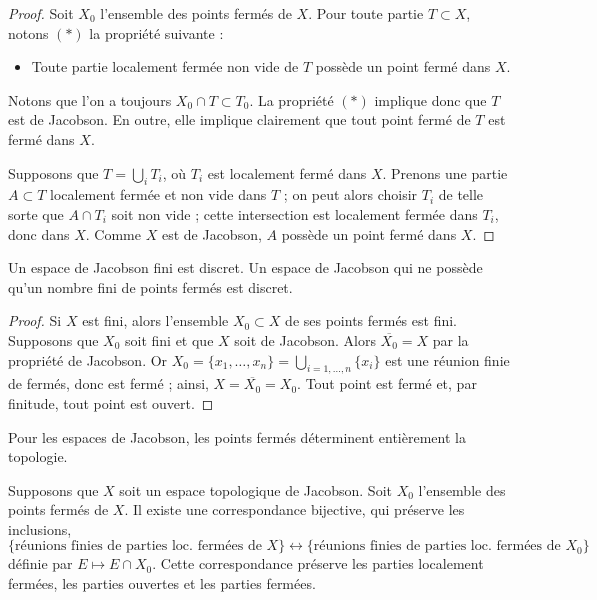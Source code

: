 \begin{proof}
Soit $X_0$ l'ensemble des points fermés de $X$. Pour toute partie
$T \subset X$, notons $(*)$ la propriété suivante :
\begin{itemize}
\item[(*)] Toute partie localement fermée non vide de $T$ possède un point
fermé dans $X$.
\end{itemize}
Notons que l'on a toujours $X_0 \cap T \subset T_0$. La propriété $(*)$
implique donc que $T$ est de Jacobson. En outre, elle implique clairement
que tout point fermé de $T$ est fermé dans $X$.

\medskip\noindent
Supposons que $T=\bigcup_i T_i$, où $T_i$ est localement fermé dans $X$.
Prenons une partie $A\subset T$ localement fermée et non vide dans $T$ ;
on peut alors choisir $T_i$ de telle sorte que $A\cap T_i$ soit non vide ; cette intersection est
localement fermée dans $T_i$, donc dans $X$.
Comme $X$ est de Jacobson, $A$ possède un point fermé dans $X$.
\end{proof}

\begin{lemma}
\label{lemma-finite-jacobson}
Un espace de Jacobson fini est discret.
Un espace de Jacobson qui ne possède qu'un nombre fini de points fermés est discret.
\end{lemma}

\begin{proof}
Si $X$ est fini, alors l'ensemble $X_0 \subset X$ de ses points fermés est fini.
Supposons que $X_0$ soit fini et que $X$ soit de Jacobson.
Alors $\overline{X_0} = X$ par la propriété de Jacobson.
Or $X_0 =\{x_1, \ldots, x_n\} = \bigcup_{i = 1, \ldots, n} \{x_i\}$
est une réunion finie de fermés, donc est fermé ; ainsi,
$X = \overline{X_0} = X_0$. Tout point est fermé et, par
finitude, tout point est ouvert.
\end{proof}

\begin{lemma}
\label{lemma-jacobson-equivalent-locally-closed}
\begin{slogan}
Pour les espaces de Jacobson, les points fermés déterminent entièrement la topologie.
\end{slogan}
Supposons que $X$ soit un espace topologique de Jacobson.
Soit $X_0$ l'ensemble des points fermés de $X$.
Il existe une correspondance bijective, qui préserve les inclusions,
$$
\{\text{réunions finies de parties loc. fermées de } X\}
\leftrightarrow
\{\text{réunions finies de parties loc. fermées de } X_0\}
$$
définie par $E \mapsto E \cap X_0$. Cette correspondance préserve
les parties localement fermées, les parties ouvertes et les parties fermées.
\end{lemma}


